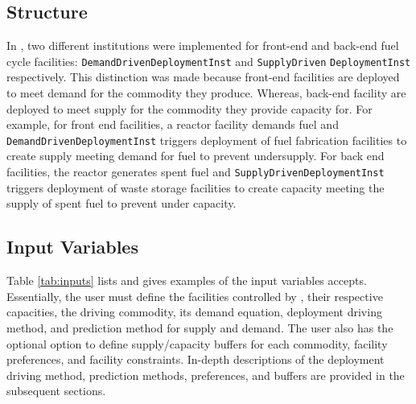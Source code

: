 \subsection{\textbf{Structure}}
In \deploy, two different institutions were implemented for 
front-end and back-end fuel cycle facilities: 
\texttt{DemandDrivenDeploymentInst} and 
\texttt{SupplyDriven} 
\noindent
\texttt{DeploymentInst} respectively. 
This distinction was made because front-end facilities 
are deployed to meet demand for the commodity they produce. 
Whereas, back-end facility are deployed to meet supply for the 
commodity they provide capacity for. 
For example, for front end facilities, a reactor facility 
demands fuel and \texttt{DemandDrivenDeploymentInst} 
triggers deployment of fuel fabrication facilities to create 
supply meeting demand for fuel to prevent undersupply. 
For back end facilities, the reactor generates spent fuel and 
\texttt{SupplyDrivenDeploymentInst} triggers deployment of 
waste storage facilities to create capacity meeting the supply 
of spent fuel to prevent under capacity. 

\subsection{\textbf{Input Variables}}
Table \ref{tab:inputs} lists and gives examples of the input 
variables \deploy accepts. 
Essentially, the user must define the facilities controlled by 
\deploy, their respective capacities, the driving commodity, 
its demand equation, deployment driving method, and prediction method 
for supply and demand. 
The user also has the optional option to define supply/capacity buffers 
for each commodity, facility preferences, and facility constraints. 
In-depth descriptions of the deployment driving method, prediction 
methods, preferences, and buffers are provided in the subsequent sections. 

